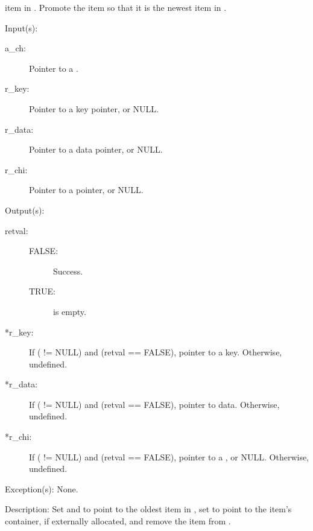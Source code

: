\begin{capi}
\begin{capilist}
		item in .  Promote the item so that it is the newest
		item in .
	\end{capilist}
\label{ch_remove_iterate}
	\begin{capilist}
	\item[Input(s): ]
		\begin{description}\item[]
		\item[a\_ch: ]
			Pointer to a .
		\item[r\_key: ]
			Pointer to a key pointer, or NULL.
		\item[r\_data: ]
			Pointer to a data pointer, or NULL.
		\item[r\_chi: ]
			Pointer to a  pointer, or NULL.
		\end{description}
	\item[Output(s): ]
		\begin{description}\item[]
		\item[retval: ]
			\begin{description}\item[]
			\item[FALSE: ]
				Success.
			\item[TRUE: ]
				 is empty.
			\end{description}
		\item[*r\_key: ]
			If ( != NULL) and (retval == FALSE),
			pointer to a key.  Otherwise, undefined.
		\item[*r\_data: ]
			If ( != NULL) and (retval == FALSE),
			pointer to data.  Otherwise, undefined.
		\item[*r\_chi: ]
			If ( != NULL) and (retval == FALSE),
			pointer to a , or NULL.  Otherwise,
			undefined.
		\end{description}
	\item[Exception(s): ] None.
	\item[Description: ]
		Set  and  to point to the oldest
		item in , set  to point to the item's
		container, if externally allocated, and remove the item from
		.
	\end{capilist}
\label{ch_dump}

\end{capi}
